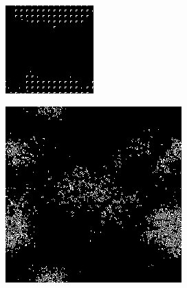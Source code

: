 \documentclass[11pt, oneside]{article}
\newenvironment{Figure}
  {\par\medskip\noindent\minipage{\linewidth}}
  {\endminipage\par\medskip}
\begin{document}
\begin{multicols}{3}
\begin{Figure}
\includegraphics[width=\linewidth]{images/128x128_2.png}
\end{Figure}

\begin{Figure}
\includegraphics[width=\linewidth]{images/256x256_2.png}
\end{Figure}



\end{multicols}
\end{document}
